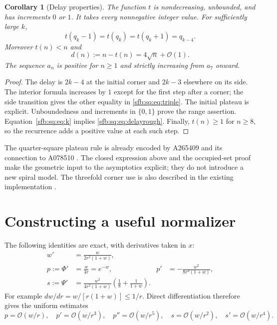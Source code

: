 \documentclass[11pt]{article}
\newtheorem{corollary}[theorem]{Corollary}
\theoremstyle{remark}\newtheorem{remark}[theorem]{Remark}
\newcommand{\OO}{\mathcal O}
\begin{document}
\begin{corollary}[Delay properties]\label{sfb:sq:cor:delay}
The function $t$ is nondecreasing, unbounded, and has increments $0$ or $1$. It takes every nonnegative integer value. For sufficiently large $k$,
\begin{equation}\label{sfb:sq:eq:triple}
 t(q_k-1)=t(q_k)=t(q_k+1)=q_{k-4}.
\end{equation}
Moreover $t(n)<n$ and
\begin{equation}\label{sfb:sq:eq:delayrough}
 d(n):=n-t(n)=4\sqrt n+\OO(1).
\end{equation}
The sequence $a_n$ is positive for $n\ge1$ and strictly increasing from $a_7$ onward.
\end{corollary}
\begin{proof}
The delay is $2k-4$ at the initial corner and $2k-3$ elsewhere on its side. The interior formula increases by $1$ except for the first step after a corner; the side transition gives the other equality in \eqref{sfb:sq:eq:triple}. The initial plateau is explicit. Unboundedness and increments in $\{0,1\}$ prove the range assertion. Equation~\eqref{sfb:sq:eq:k} implies \eqref{sfb:sq:eq:delayrough}. Finally, $t(n)\ge1$ for $n\ge8$, so the recurrence adds a positive value at each such step.
\end{proof}

The quarter-square plateau rule is already encoded by A265409 and its connection to A078510 \cite{oeis510,oeis409}. The closed expression above and the occupied-set proof make the geometric input to the asymptotics explicit; they do not introduce a new spiral model. The threefold corner use is also described in the existing implementation \cite{ryde}.

\section{Constructing a useful normalizer}\label{sfb:sq:sec:normalizer}
The following identities are exact, with derivatives taken in $x$:
\begin{align}
 w'&=\frac{w}{2r^2(1+w)},\label{sfb:sq:eq:wprime}\\
 p:=\Phi'&=\frac{w}{4r}=e^{-w},&
 p'&=-\frac{w^2}{8r^3(1+w)},\label{sfb:sq:eq:p}\\
 s:=\Psi'&=\frac{w^2}{4r^2(1+w)}
       \left(\frac18+\frac1{1+w}\right).\label{sfb:sq:eq:s}
\end{align}
For example $dw/dr=w/[r(1+w)]\le1/r$. Direct differentiation therefore gives the uniform estimates
\begin{equation}\label{sfb:sq:eq:derivativeorders}
 p=\OO(w/r),\quad p'=\OO(w/r^3),\quad p''=\OO(w/r^5),
 \quad s=\OO(w/r^2),\quad s'=\OO(w/r^4).
\end{equation}
\end{document}
